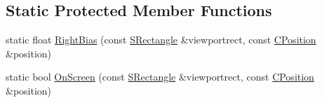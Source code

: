 \subsection*{Static Protected Member Functions}
\begin{DoxyCompactItemize}
\item 
static float \hyperlink{classCSoundEventRenderer_a4be5ff09785c55c3b5b6966fb41eb47f}{Right\+Bias} (const \hyperlink{structSRectangle}{S\+Rectangle} \&viewportrect, const \hyperlink{classCPosition}{C\+Position} \&position)
\item 
static bool \hyperlink{classCSoundEventRenderer_a9df97d476a3a39cb7126db9c366c2f0c}{On\+Screen} (const \hyperlink{structSRectangle}{S\+Rectangle} \&viewportrect, const \hyperlink{classCPosition}{C\+Position} \&position)
\end{DoxyCompactItemize}
